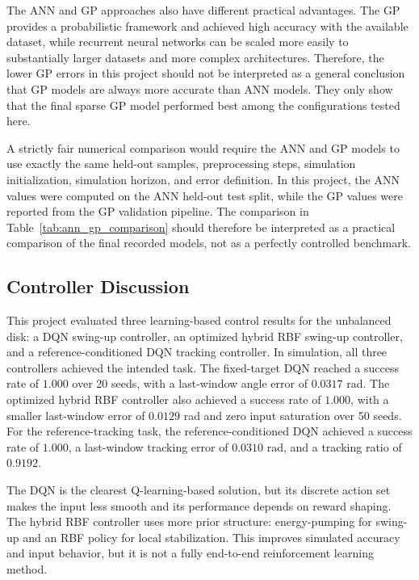 \documentclass[conference]{IEEEtran}
\begin{document}
The ANN and GP approaches also have different practical advantages.
The GP provides a probabilistic framework and achieved high accuracy
with the available dataset, while recurrent neural networks can be
scaled more easily to substantially larger datasets and more complex
architectures. Therefore, the lower GP errors in this project should not
be interpreted as a general conclusion that GP models are always more
accurate than ANN models. They only show that the final sparse GP model
performed best among the configurations tested here.

A strictly fair numerical comparison would require the ANN and GP
models to use exactly the same held-out samples, preprocessing steps,
simulation initialization, simulation horizon, and error definition.
In this project, the ANN values were computed on the ANN held-out test
split, while the GP values were reported from the GP validation
pipeline. The comparison in Table~\ref{tab:ann_gp_comparison} should
therefore be interpreted as a practical comparison of the final
recorded models, not as a perfectly controlled benchmark.


\subsection{Controller Discussion}

This project evaluated three learning-based control results for the unbalanced
disk: a DQN swing-up controller, an optimized hybrid RBF swing-up controller,
and a reference-conditioned DQN tracking controller. In simulation, all three
controllers achieved the intended task. The fixed-target DQN reached a success
rate of \(1.000\) over 20 seeds, with a last-window angle error of
\(0.0317\) rad. The optimized hybrid RBF controller also achieved a success
rate of \(1.000\), with a smaller last-window error of \(0.0129\) rad and zero
input saturation over 50 seeds. For the reference-tracking task, the
reference-conditioned DQN achieved a success rate of \(1.000\), a last-window
tracking error of \(0.0310\) rad, and a tracking ratio of \(0.9192\).

The DQN is the clearest Q-learning-based solution, but its discrete action set
makes the input less smooth and its performance depends on reward shaping. The
hybrid RBF controller uses more prior structure: energy-pumping for swing-up
and an RBF policy for local stabilization. This improves simulated accuracy and
input behavior, but it is not a fully end-to-end reinforcement learning method.
\end{document}
